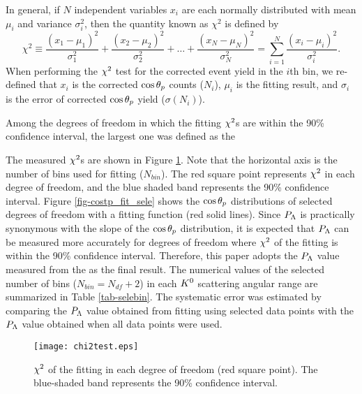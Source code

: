 In general, if $N$ independent variables $x_i$ are each normally distributed with mean $\mu_i$ and variance $\sigma_i^2$, then the quantity known as $\chi^2$ is defined by
\begin{equation}
  \chi^2 \equiv \frac{(x_1 - \mu_1)^2}{\sigma_1^2} + \frac{(x_2 - \mu_2)^2}{\sigma_2^2} + \dots + \frac{(x_N - \mu_N)^2}{\sigma_N^2} = \sum_{i=1}^N \frac{(x_i - \mu_i)^2}{\sigma_i^2}.
\end{equation}
When performing the $\chi^{2}$ test for the corrected event yield in the $i$th bin, we re-defined that $x_i$ is the corrected $\cos{\theta_p}$ counts ($N_i$), $\mu_i$ is the fitting result, and $\sigma_i$ is the error of corrected $\cos{\theta_p}$ yield ($\sigma(N_i)$). 

Among the degrees of freedom in which the fitting $\chi^{2}$s are within the 90\% confidence interval, the largest one was defined as the 

The measured $\chi^{2}$s are shown in Figure \ref{fig-chi2test}. Note that the horizontal axis is the number of bins used for fitting ($N_{bin}$). The red square point represents $\chi^{2}$ in each degree of freedom, and the blue shaded band represents the 90\% confidence interval. Figure \ref{fig-costp_fit_sele} shows the $\cos{\theta_p}$ distributions of selected degrees of freedom with a fitting function (red solid lines). 
Since $P_{\Lambda}$ is practically synonymous with the slope of the $\cos{\theta_p}$ distribution, it is expected that $P_{\Lambda}$ can be measured more accurately for degrees of freedom where $\chi^{2}$ of the fitting is within the 90\% confidence interval. Therefore, this paper adopts the $P_{\Lambda}$ value measured from the  as the final result.
The numerical values of the selected number of bins ($N_{bin}=N_{df}+2$) in each $K^{0}$ scattering angular range are summarized in Table \ref{tab-selebin}. The systematic error was estimated by comparing the $P_{\Lambda}$ value obtained from fitting using selected data points with the $P_{\Lambda}$ value obtained when all data points were used.

\begin{figure}[!h]
  \centering
  \texttt{[image: chi2test.eps]}
  \caption{$\chi^{2}$ of the fitting in each degree of freedom (red square point). The blue-shaded band represents the 90\% confidence interval.}
  \label{fig-chi2test}
\end{figure}

